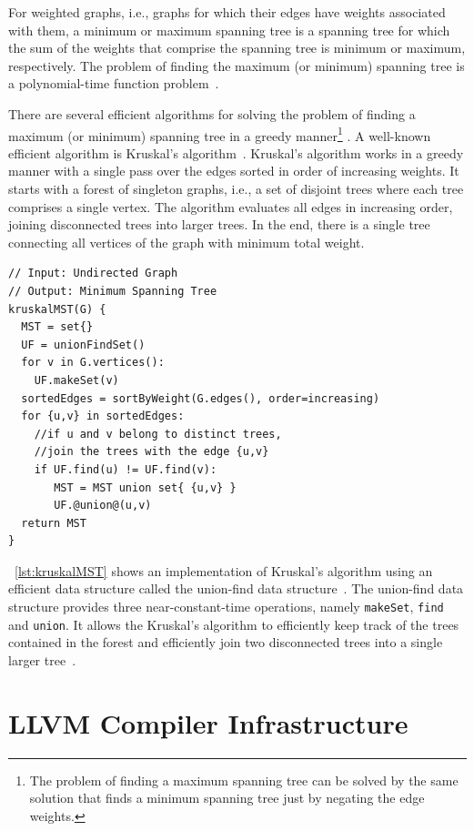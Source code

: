 For weighted graphs, i.e., graphs for which their edges have weights associated with them, a minimum or maximum spanning tree is a spanning tree for which
the sum of the weights that comprise the spanning tree is minimum or maximum, respectively.
The problem of finding the maximum (or minimum) spanning tree is a polynomial-time function problem~\citep{kruskal56,bazlamacci01}.

There are several efficient algorithms for solving the problem of finding a maximum (or minimum) spanning tree in a greedy manner\footnote{The problem of finding a maximum spanning tree can be solved by the same solution that finds a minimum spanning tree just by negating the edge weights.} \citep{bazlamacci01}.
A well-known efficient algorithm is Kruskal's algorithm~\citep{kruskal56}.
Kruskal's algorithm works in a greedy manner with a single pass over the edges sorted in order of increasing weights.
It starts with a forest of singleton graphs, i.e., a set of disjoint trees where each tree comprises a single vertex.
The algorithm evaluates all edges in increasing order, joining disconnected trees into larger trees.
In the end, there is a single tree connecting all vertices of the graph with minimum total weight.

\begin{lstlisting}[caption={Kruskal's algorithm for finding a minimum spanning tree}, label={lst:kruskalMST}]
// Input: Undirected Graph
// Output: Minimum Spanning Tree
kruskalMST(G) {
  MST = set{}
  UF = unionFindSet()
  for v in G.vertices():
    UF.makeSet(v)
  sortedEdges = sortByWeight(G.edges(), order=increasing)
  for {u,v} in sortedEdges:
    //if u and v belong to distinct trees,
    //join the trees with the edge {u,v}
    if UF.find(u) != UF.find(v):
       MST = MST union set{ {u,v} }
       UF.@union@(u,v)
  return MST
}
\end{lstlisting}

\lstlistingname~\ref{lst:kruskalMST} shows an implementation of Kruskal's algorithm using an efficient data structure called the union-find data structure~\citep{hopcroft73,tarjan75}.
The union-find data structure provides three near-constant-time operations, namely \verb|makeSet|, \verb|find| and \verb|union|.
It allows the Kruskal's algorithm to efficiently keep track of the trees contained in the forest and efficiently join two disconnected trees into a single larger tree~\citep{galil91}.

\section{LLVM Compiler Infrastructure}

